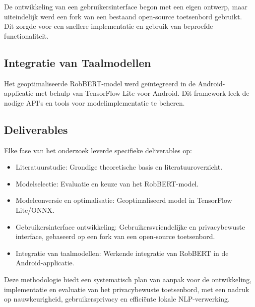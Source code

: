 De ontwikkeling van een gebruikersinterface begon met een eigen ontwerp, maar uiteindelijk werd een fork van een bestaand open-source toetsenbord gebruikt. Dit zorgde voor een snellere implementatie en gebruik van beproefde functionaliteit.

\subsection{Integratie van Taalmodellen}

Het geoptimaliseerde RobBERT-model werd geïntegreerd in de Android-applicatie met behulp van TensorFlow Lite voor Android. Dit framework leek de nodige API's en tools voor modelimplementatie te beheren\autocite{ulukaya2023}.

\subsection{Deliverables}

Elke fase van het onderzoek leverde specifieke deliverables op:
\begin{itemize}
    \item Literatuurstudie: Grondige theoretische basis en literatuuroverzicht.
    \item Modelselectie: Evaluatie en keuze van het RobBERT-model.
    \item Modelconversie en optimalisatie: Geoptimaliseerd model in TensorFlow Lite/ONNX.
    \item Gebruikersinterface ontwikkeling: Gebruikersvriendelijke en privacybewuste interface, gebaseerd op een fork van een open-source toetsenbord.
    \item Integratie van taalmodellen: Werkende integratie van RobBERT in de Android-applicatie.
\end{itemize}

Deze methodologie biedt een systematisch plan van aanpak voor de ontwikkeling, implementatie en evaluatie van het privacybewuste toetsenbord, met een nadruk op nauwkeurigheid, gebruikersprivacy en efficiënte lokale NLP-verwerking.